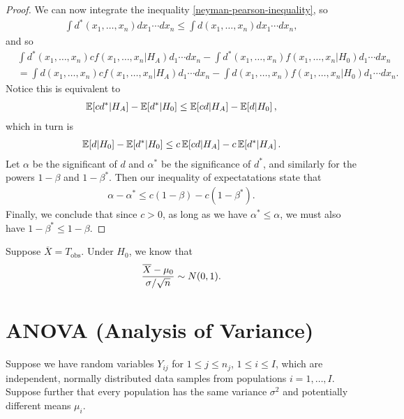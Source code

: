 \begin{proof}
    We can now integrate the inequality \ref{neyman-pearson-inequality}, so
    \begin{align*}
        \int d^{*}(x_1, \ldots, x_n)dx_1\cdots dx_n \leq \int d(x_1, \ldots, x_n)dx_1\cdots dx_n,
    \end{align*}
    and so
    \begin{align*}
        &\int d^{*}(x_1, \ldots, x_n)cf(x_1, \ldots, x_n|H_A)d_1\cdots dx_n - \int d^{*}(x_1, \ldots, x_n)f(x_1, \ldots, x_n|H_0)d_1\cdots dx_n \\
        &= \int d(x_1, \ldots, x_n)cf(x_1, \ldots, x_n|H_A)d_1\cdots dx_n - \int d(x_1, \ldots, x_n)f(x_1, \ldots, x_n|H_0)d_1\cdots dx_n.
    \end{align*}
    Notice this is equivalent to
    \begin{align*}
        \operatorname{\mathbb{E}}\!\left[{cd^{*}|H_A}\right] - \operatorname{\mathbb{E}}\!\left[{d^{*}|H_0}\right] \leq \operatorname{\mathbb{E}}\!\left[{cd|H_A}\right] - \operatorname{\mathbb{E}}\!\left[{d|H_0}\right],
    \end{align*}
    which in turn is
    \begin{align*}
        \operatorname{\mathbb{E}}\!\left[{d|H_0}\right]  - \operatorname{\mathbb{E}}\!\left[{d^{*}|H_0}\right] \leq c\operatorname{\mathbb{E}}\!\left[{cd|H_A}\right] - c\operatorname{\mathbb{E}}\!\left[{d^{*}|H_A}\right].
    \end{align*}
    Let $\alpha$ be the significant of $d$ and $\alpha^{*}$ be the significance of $d^{*}$, and similarly for the powers $1 - \beta$ and $1 - \beta^{*}$. Then our inequality of expectatations state that
    \begin{align*}
        \alpha - \alpha^{*} \leq c(1 - \beta) - c(1 - \beta^{*}).
    \end{align*}
    Finally, we conclude that since $c > 0$, as long as we have $\alpha^{*} \leq \alpha$, we must also have $1 - \beta^{*} \leq 1 - \beta$.
\end{proof}

\begin{exmp}
    Suppose $\overline{X} = T_{\textrm{obs}}$. Under $H_0$, we know that
    \begin{align*}
        \frac{\overline{X}-\mu_0}{\sigma/\sqrt{n}} \sim N(0, 1).
    \end{align*}
\end{exmp}

\section{ANOVA (Analysis of Variance)}

Suppose we have random variables $Y_{ij}$ for $1 \leq j \leq n_j$, $1 \leq i \leq I$, which are independent, normally distributed data samples from populations $i = 1, \ldots, I$. Suppose further that every population has the same variance $\sigma^2$ and potentially different means $\mu_i$.

